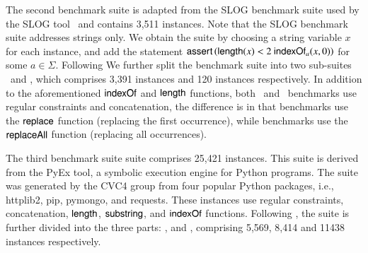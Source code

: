 %
%
%

The second benchmark suite {\slogbench} is adapted from the SLOG benchmark suite used by the SLOG tool~\cite{fang-yu-circuits} and contains 3,511 instances. 
Note that the SLOG benchmark suite addresses strings only. We  obtain the {\slogbench} suite by choosing a string variable $x$ for each instance,
and add the statement $\textsf{assert}\left(\mathsf{length}(x) < 2\ \mathsf{indexOf}_{a}(x, 0)\right)$ for some $a \in \Sigma$.
Following \cite{CHL+19} We further split the {\slogbench} benchmark suite into two sub-suites \slogbenchr\ and \slogbenchra, which comprises 3,391 instances and 120 instances respectively. In addition to the aforementioned $\mathsf{indexOf}$ and $\mathsf{length}$ functions, both  \slogbenchr\ and \slogbenchra\ benchmarks use regular constraints and concatenation, the difference is in that {\slogbenchr} benchmarks use the $\mathsf{replace}$ function (replacing the first occurrence), while {\slogbenchra} benchmarks use the $\mathsf{replaceAll}$ function (replacing all occurrences).


The third benchmark suite  {\pyexbench} suite \cite{ReynoldsWBBLT17} comprises 25,421 instances. 
This suite is derived from the PyEx tool, a symbolic execution engine for Python programs. The {\pyexbench} suite was generated by the CVC4 group from four popular Python packages, i.e., httplib2, pip, pymongo, and requests. These instances use regular constraints, concatenation, $\mathsf{length}$, $\mathsf{substring}$, and $\mathsf{indexOf}$ functions. Following \cite{ReynoldsWBBLT17}, the {\pyexbench} suite is further divided into the three parts: {\pyextdbench},  {\pyexztbench} and {\pyexzzbench}, comprising 5,569, 8,414 and 11438  instances respectively. 

